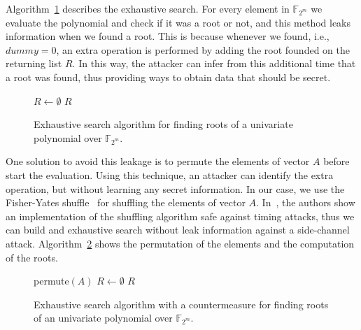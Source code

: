 Algorithm~\ref{alg:exhaustive} describes the exhaustive search. For every element in $\mathbb{F}_{2^m}$ we evaluate the polynomial and check if it was a root or not, and this method leaks information when we found a root. This is because whenever we found, i.e., $dummy = 0$, an extra operation is performed by adding the root founded on the returning list $R$. In this way, the attacker can infer from this additional time that a root was found, thus providing ways to obtain data that should be secret.

\begin{figure}[ht]
\begin{algorithm}[H]
 $R \gets \emptyset$\;
\Return $R$\;
  \caption{Exhaustive search algorithm for finding roots of a univariate polynomial over $\mathbb{F}_{2^m}$.}\label{alg:exhaustive}
\end{algorithm}
\end{figure}

One solution to avoid this leakage is to permute the elements of vector $A$ before start the evaluation. Using this technique, an attacker can identify the extra operation, but without learning any secret information. In our case, we use the Fisher-Yates shuffle~\cite{black2005fisher} for shuffling the elements of vector $A$. In~\cite{wang2018fpga}, the authors show an implementation of the shuffling algorithm safe against timing attacks, thus we can build and exhaustive search without leak information against a side-channel attack. Algorithm~\ref{alg:exhaustive_permuted} shows the permutation of the elements and the computation of the roots.

\begin{figure}[ht]
\begin{algorithm}[H]
  permute$(A)$\;
 $R \gets \emptyset$\;
\Return $R$\;
 \caption{Exhaustive search algorithm with a countermeasure for finding roots of an univariate polynomial over $\mathbb{F}_{2^m}$.}
  \label{alg:exhaustive_permuted}
\end{algorithm}
\end{figure}

